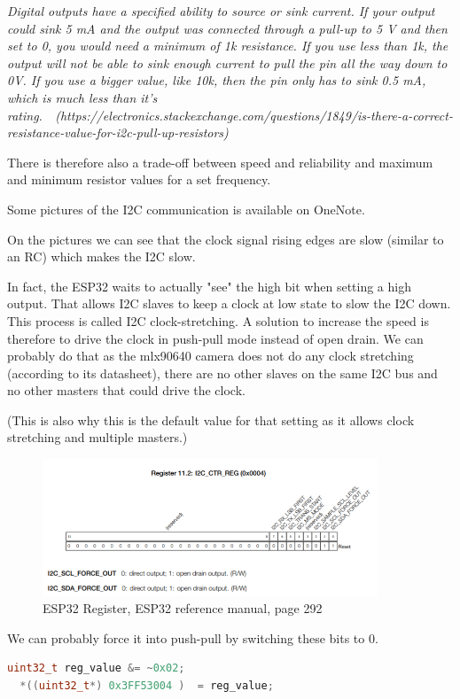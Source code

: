 \documentclass[a4paper]{article}
\begin{document}
\textit{Digital outputs have a specified ability to source or sink current. If your output could sink 5 mA and the output was connected through a pull-up to 5 V and then set to 0, you would need a minimum of 1k resistance. If you use less than 1k, the output will not be able to sink enough current to pull the pin all the way down to 0V. If you use a bigger value, like 10k, then the pin only has to sink 0.5 mA, which is much less than it's rating.  (https://electronics.stackexchange.com/questions/1849/is-there-a-correct-resistance-value-for-i2c-pull-up-resistors)
}

There is therefore also a trade-off between speed and reliability and maximum and minimum resistor values for a set frequency.


Some pictures of the I2C communication is available on OneNote.

On the pictures we can see that the clock signal rising edges are slow (similar to an RC) which makes the I2C slow.

In fact, the ESP32 waits to actually "see" the high bit when setting a high output. That allows I2C slaves to keep a clock at low state to slow the I2C down. This process is called I2C clock-stretching.
A solution to increase the speed is therefore to drive the clock in push-pull mode instead of open drain. We can probably do that as the mlx90640 camera does not do any clock stretching (according to its datasheet), there are no other slaves on the same I2C bus and no other masters that could drive the clock.

(This is also why this is the default value for that setting as it allows clock stretching and multiple masters.)

\begin{figure}
    \centering
    \includegraphics[width = 10cm]{images/reg_esp.png}
    \caption{ESP32 Register, ESP32 reference manual, page 292}
    \label{fig:reg_esp}
\end{figure}

We can probably force it into push-pull by switching these bits to 0.
\begin{lstlisting}[language=C++]
  uint32_t reg_value &= ~0x02;
  *((uint32_t*) 0x3FF53004 )  = reg_value;
\end{lstlisting}
\end{document}

